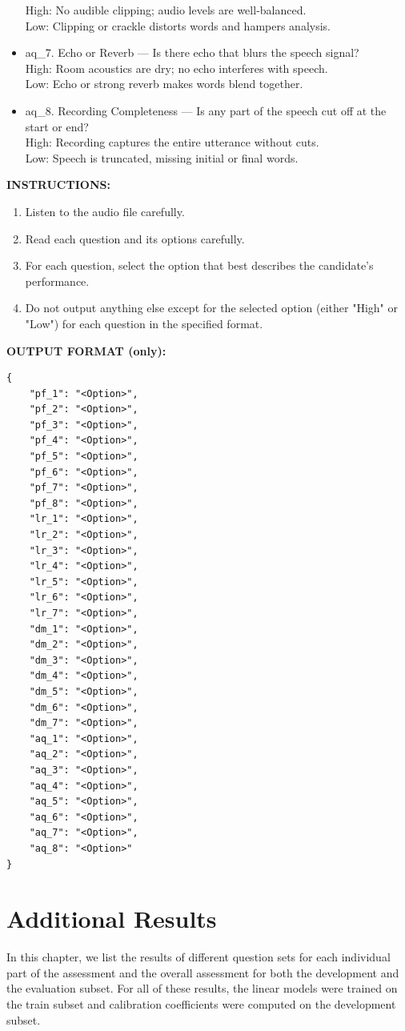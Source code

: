\documentclass{report}
\begin{document}
\begin{tcolorbox}[breakable, colback=white, colframe=black, title=Revised Question Set Batch Prompt]
\begin{itemize}
    High: No audible clipping; audio levels are well‑balanced.\\
    Low: Clipping or crackle distorts words and hampers analysis.
  \item aq\_7. Echo or Reverb — Is there echo that blurs the speech signal?\\
    High: Room acoustics are dry; no echo interferes with speech.\\
    Low: Echo or strong reverb makes words blend together.
  \item aq\_8. Recording Completeness — Is any part of the speech cut off at the start or end?\\
    High: Recording captures the entire utterance without cuts.\\
    Low: Speech is truncated, missing initial or final words.
\end{itemize}

\textbf{INSTRUCTIONS:}
\begin{enumerate}
  \item Listen to the audio file carefully.
  \item Read each question and its options carefully.
  \item For each question, select the option that best describes the candidate's performance.
  \item Do not output anything else except for the selected option (either "High" or "Low") for each question in the specified format.
\end{enumerate}

\textbf{OUTPUT FORMAT (only):}
\begin{verbatim}
{
    "pf_1": "<Option>",
    "pf_2": "<Option>",
    "pf_3": "<Option>",
    "pf_4": "<Option>",
    "pf_5": "<Option>",
    "pf_6": "<Option>",
    "pf_7": "<Option>",
    "pf_8": "<Option>",
    "lr_1": "<Option>",
    "lr_2": "<Option>",
    "lr_3": "<Option>",
    "lr_4": "<Option>",
    "lr_5": "<Option>",
    "lr_6": "<Option>",
    "lr_7": "<Option>",
    "dm_1": "<Option>",
    "dm_2": "<Option>",
    "dm_3": "<Option>",
    "dm_4": "<Option>",
    "dm_5": "<Option>",
    "dm_6": "<Option>",
    "dm_7": "<Option>",
    "aq_1": "<Option>",
    "aq_2": "<Option>",
    "aq_3": "<Option>",
    "aq_4": "<Option>",
    "aq_5": "<Option>",
    "aq_6": "<Option>",
    "aq_7": "<Option>",
    "aq_8": "<Option>"
}
\end{verbatim}
\end{tcolorbox}

\chapter{Additional Results}
\label{app:additional_results}
In this chapter, we list the results of different question sets for each individual part of the assessment and the overall assessment for both the development and the evaluation subset. For all of these results, the linear models were trained on the train subset and calibration coefficients were computed on the development subset.
\end{document}
